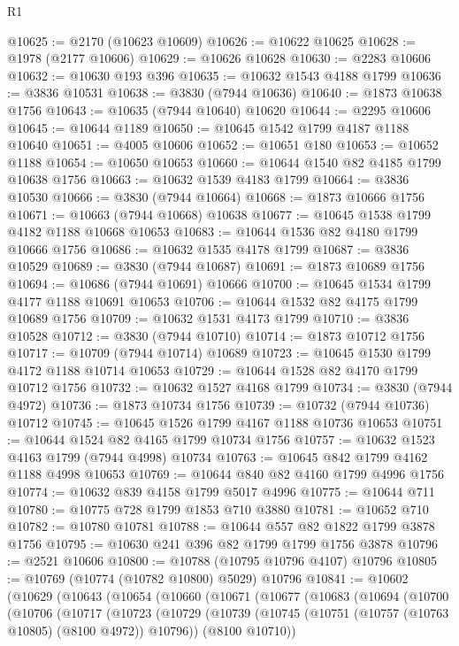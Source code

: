 \begin{lexlean}{R1}
\begin{coremodule}
@10625 := @2170 (@10623 @10609)
@10626 := @10622 @10625
@10628 := @1978 (@2177 @10606)
@10629 := @10626 @10628
@10630 := @2283 @10606
@10632 := @10630 @193 @396
@10635 := @10632 @1543 @4188 @1799
@10636 := @3836 @10531
@10638 := @3830 (@7944 @10636)
@10640 := @1873 @10638 @1756
@10643 := @10635 (@7944 @10640) @10620
@10644 := @2295 @10606
@10645 := @10644 @1189
@10650 := @10645 @1542 @1799 @4187 @1188 @10640
@10651 := @4005 @10606
@10652 := @10651 @180
@10653 := @10652 @1188
@10654 := @10650 @10653
@10660 := @10644 @1540 @82 @4185 @1799 @10638 @1756
@10663 := @10632 @1539 @4183 @1799
@10664 := @3836 @10530
@10666 := @3830 (@7944 @10664)
@10668 := @1873 @10666 @1756
@10671 := @10663 (@7944 @10668) @10638
@10677 := @10645 @1538 @1799 @4182 @1188 @10668 @10653
@10683 := @10644 @1536 @82 @4180 @1799 @10666 @1756
@10686 := @10632 @1535 @4178 @1799
@10687 := @3836 @10529
@10689 := @3830 (@7944 @10687)
@10691 := @1873 @10689 @1756
@10694 := @10686 (@7944 @10691) @10666
@10700 := @10645 @1534 @1799 @4177 @1188 @10691 @10653
@10706 := @10644 @1532 @82 @4175 @1799 @10689 @1756
@10709 := @10632 @1531 @4173 @1799
@10710 := @3836 @10528
@10712 := @3830 (@7944 @10710)
@10714 := @1873 @10712 @1756
@10717 := @10709 (@7944 @10714) @10689
@10723 := @10645 @1530 @1799 @4172 @1188 @10714 @10653
@10729 := @10644 @1528 @82 @4170 @1799 @10712 @1756
@10732 := @10632 @1527 @4168 @1799
@10734 := @3830 (@7944 @4972)
@10736 := @1873 @10734 @1756
@10739 := @10732 (@7944 @10736) @10712
@10745 := @10645 @1526 @1799 @4167 @1188 @10736 @10653
@10751 := @10644 @1524 @82 @4165 @1799 @10734 @1756
@10757 := @10632 @1523 @4163 @1799 (@7944 @4998) @10734
@10763 := @10645 @842 @1799 @4162 @1188 @4998 @10653
@10769 := @10644 @840 @82 @4160 @1799 @4996 @1756
@10774 := @10632 @839 @4158 @1799 @5017 @4996
@10775 := @10644 @711
@10780 := @10775 @728 @1799 @1853 @710 @3880
@10781 := @10652 @710
@10782 := @10780 @10781
@10788 := @10644 @557 @82 @1822 @1799 @3878 @1756
@10795 := @10630 @241 @396 @82 @1799 @1799 @1756 @3878
@10796 := @2521 @10606
@10800 := @10788 (@10795 @10796 @4107) @10796
@10805 := @10769 (@10774 (@10782 @10800) @5029) @10796
@10841 := @10602
    (@10629
      (@10643
        (@10654
          (@10660
            (@10671
              (@10677
                (@10683
                  (@10694
                    (@10700
                      (@10706
                        (@10717
                          (@10723
                            (@10729
                              (@10739
                                (@10745 (@10751 (@10757 (@10763 @10805) (@8100 @4972)) @10796))
                                (@8100 @10710))

\end{coremodule}
\end{lexlean}
